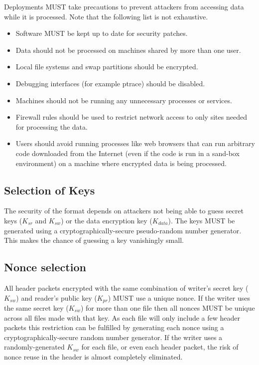\documentclass[10pt]{article}
\begin{document}
Deployments MUST take precautions to prevent attackers from accessing data while it is processed.
Note that the following list is not exhaustive.
\begin{itemize}
\item Software MUST be kept up to date for security patches.
\item Data should not be processed on machines shared by more than one user.
\item Local file systems and swap partitions should be encrypted.
\item Debugging interfaces (for example ptrace) should be disabled.
\item Machines should not be running any unnecessary processes or services.
\item Firewall rules should be used to restrict network access to only sites needed for processing the data.
\item Users should avoid running processes like web browsers that can run arbitrary code downloaded from the Internet
(even if the code is run in a sand-box environment) on a machine where encrypted data is being processed.
\end{itemize}

\subsection{Selection of Keys}
The security of the format depends on attackers not being able to guess secret keys ($K_{sr}$ and $K_{sw}$)
or the data encryption key ($K_{data}$).
The keys MUST be generated using a cryptographically-secure pseudo-random number generator.
This makes the chance of guessing a key vanishingly small.

\subsection{Nonce selection}
All header packets encrypted with the same combination of writer's secret key ($K_{sw}$)
and reader's public key ($K_{pr}$) MUST use a unique nonce.
If the writer uses the same secret key ($K_{sw}$) for more than one file then all nonces MUST be unique across all
files made with that key.
As each file will only include a few header packets this restriction can be fulfilled by generating each nonce
using a cryptographically-secure random number generator.
If the writer uses a randomly-generated $K_{sw}$ for each file, or even each header packet, the risk of nonce reuse in
the header is almost completely eliminated.
\end{document}

